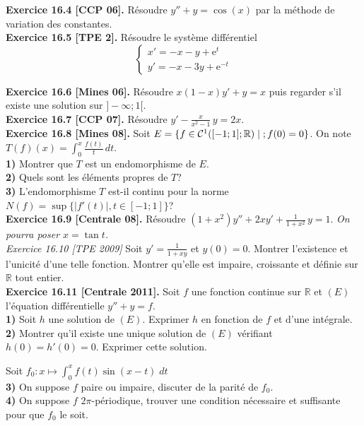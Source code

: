 \documentclass[a4paper,12pt,francais]{article}
\newcommand{\field}[1]{\mathbb{#1}}
\newcommand{\R}{\field{R}}
\newcommand{\e}{\mbox{e}}
\begin{document}
\noindent
{\bf Exercice 16.4 [CCP 06].} Résoudre $y''+y=\cos(x)$ par la
méthode de variation des constantes.\\

\noindent
{\bf Exercice 16.5 [TPE 2].} Résoudre le système différentiel
$$\left\{ \begin{array}{l}
x'=-x-y+\e^t\\
y'=-x-3y+\e^{-t}
\end{array}
\right.$$

\noindent
{\bf Exercice 16.6 [Mines 06].} Résoudre $x(1-x)y'+y=x$ puis regarder
s'il existe une solution sur $]-\infty;1[$.\\

\noindent
{\bf Exercice 16.7 [CCP 07].} Résoudre $y'-\frac{x}{x^2-1}\, y=2x$.\\

\noindent
{\bf Exercice 16.8 [Mines 08].} Soit $E=\{f\in {\cal{C}}^1([-1;1];\R) \; |\;; f(0)=0\}$. On note $T(f)(x)=\int_0^x \frac{f(t)}{t}\, dt$.\\
{\bf 1)} Montrer que $T$ est un endomorphisme de $E$.\\
{\bf 2)} Quels sont les éléments propres de $T$?\\
{\bf 3)} L'endomorphisme $T$ est-il continu pour la norme $N(f)=\sup\{ |f'(t)| ,t\in [-1;1]\}$?\\

\noindent
{\bf Exercice 16.9 [Centrale 08].} Résoudre $\displaystyle (1+x^2)y''+2xy'+\frac{1}{1+x^2}\, y=1.$ {\it On pourra poser $x=\tan t$.}\\

\noindent
{\it Exercice 16.10 [TPE 2009]} Soit $y'=\frac{1}{1+xy}$ et $y(0)=0$. Montrer l'existence et l'unicité d'une telle fonction. Montrer qu'elle est impaire, croissante et définie sur $\R$ tout entier.\\

\noindent
{\bf Exercice 16.11 [Centrale 2011].} Soit $f$ une fonction continue sur $\R$ et $(E)$ l'équation différentielle $y''+y=f$.\\
{\bf 1)} Soit $h$ une solution de $(E)$. Exprimer $h$ en fonction de $f$ et d'une intégrale.\\
{\bf 2)} Montrer qu'il existe une unique solution de $(E)$ vérifiant $h(0)=h'(0)=0$. Exprimer cette solution.

Soit $f_0:x \mapsto \int_0^x f(t) \sin(x-t)\; dt$ \\
\noindent
{\bf 3)} On suppose $f$ paire ou impaire, discuter de la parité de $f_0$.\\
{\bf 4)} On suppose $f$ $2 \pi$-périodique, trouver une condition nécessaire et suffisante pour que $f_0$ le soit.\\
\end{document}
